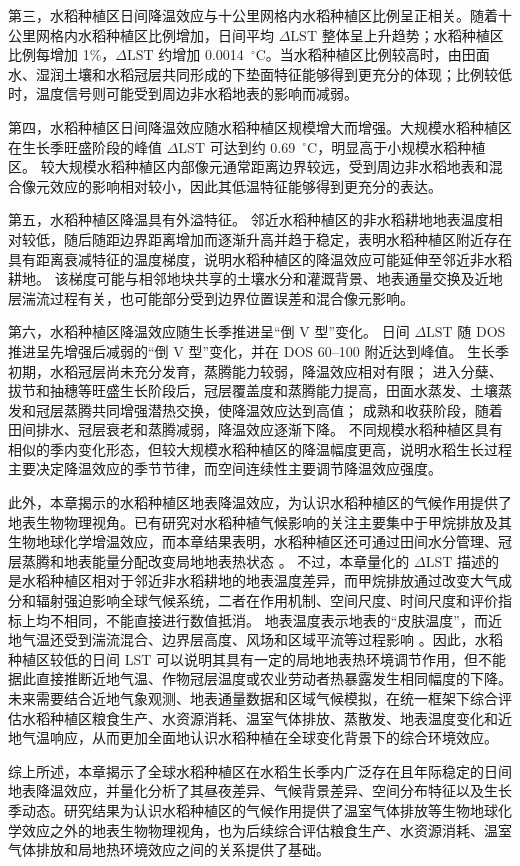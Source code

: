 第三，水稻种植区日间降温效应与十公里网格内水稻种植区比例呈正相关。随着十公里网格内水稻种植区比例增加，日间平均 $\Delta \mathrm{LST}$ 整体呈上升趋势；水稻种植区比例每增加 1\%，$\Delta \mathrm{LST}$ 约增加 0.0014~$^{\circ}\mathrm{C}$。当水稻种植区比例较高时，由田面水、湿润土壤和水稻冠层共同形成的下垫面特征能够得到更充分的体现；比例较低时，温度信号则可能受到周边非水稻地表的影响而减弱。

第四，水稻种植区日间降温效应随水稻种植区规模增大而增强。大规模水稻种植区在生长季旺盛阶段的峰值 $\Delta \mathrm{LST}$ 可达到约 0.69~$^{\circ}\mathrm{C}$，明显高于小规模水稻种植区。
较大规模水稻种植区内部像元通常距离边界较远，受到周边非水稻地表和混合像元效应的影响相对较小，因此其低温特征能够得到更充分的表达。

第五，水稻种植区降温具有外溢特征。
邻近水稻种植区的非水稻耕地地表温度相对较低，随后随距边界距离增加而逐渐升高并趋于稳定，表明水稻种植区附近存在具有距离衰减特征的温度梯度，说明水稻种植区的降温效应可能延伸至邻近非水稻耕地。
该梯度可能与相邻地块共享的土壤水分和灌溉背景、地表通量交换及近地层湍流过程有关，也可能部分受到边界位置误差和混合像元影响。

第六，水稻种植区降温效应随生长季推进呈“倒 V 型”变化。
日间 $\Delta \mathrm{LST}$ 随 DOS 推进呈先增强后减弱的“倒 V 型”变化，并在 DOS 60--100 附近达到峰值。
生长季初期，水稻冠层尚未充分发育，蒸腾能力较弱，降温效应相对有限；
进入分蘖、拔节和抽穗等旺盛生长阶段后，冠层覆盖度和蒸腾能力提高，田面水蒸发、土壤蒸发和冠层蒸腾共同增强潜热交换，使降温效应达到高值；
成熟和收获阶段，随着田间排水、冠层衰老和蒸腾减弱，降温效应逐渐下降。
不同规模水稻种植区具有相似的季内变化形态，但较大规模水稻种植区的降温幅度更高，说明水稻生长过程主要决定降温效应的季节节律，而空间连续性主要调节降温效应强度。

此外，本章揭示的水稻种植区地表降温效应，为认识水稻种植区的气候作用提供了地表生物物理视角。已有研究对水稻种植气候影响的关注主要集中于甲烷排放及其生物地球化学增温效应，而本章结果表明，水稻种植区还可通过田间水分管理、冠层蒸腾和地表能量分配改变局地地表热状态 \cite{Zhang2020NatCommun,Qian2023RiceGHG}。
不过，本章量化的 $\Delta \mathrm{LST}$ 描述的是水稻种植区相对于邻近非水稻耕地的地表温度差异，而甲烷排放通过改变大气成分和辐射强迫影响全球气候系统，二者在作用机制、空间尺度、时间尺度和评价指标上均不相同，不能直接进行数值抵消。
地表温度表示地表的“皮肤温度”，而近地气温还受到湍流混合、边界层高度、风场和区域平流等过程影响 \cite{Li2013RSELST,Li2023LSTReview,Winckler2019ESD}。因此，水稻种植区较低的日间 LST 可以说明其具有一定的局地地表热环境调节作用，但不能据此直接推断近地气温、作物冠层温度或农业劳动者热暴露发生相同幅度的下降。
未来需要结合近地气象观测、地表通量数据和区域气候模拟，在统一框架下综合评估水稻种植区粮食生产、水资源消耗、温室气体排放、蒸散发、地表温度变化和近地气温响应，从而更加全面地认识水稻种植在全球变化背景下的综合环境效应。

综上所述，本章揭示了全球水稻种植区在水稻生长季内广泛存在且年际稳定的日间地表降温效应，并量化分析了其昼夜差异、气候背景差异、空间分布特征以及生长季动态。研究结果为认识水稻种植区的气候作用提供了温室气体排放等生物地球化学效应之外的地表生物物理视角，也为后续综合评估粮食生产、水资源消耗、温室气体排放和局地热环境效应之间的关系提供了基础。
